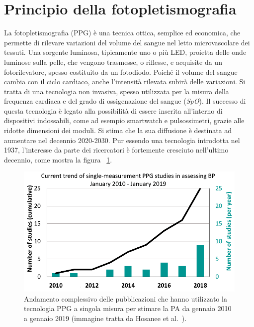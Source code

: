 \section{Principio della fotopletismografia}
La fotopletismografia (PPG) è una tecnica ottica, semplice ed economica, che permette di rilevare variazioni del volume del sangue nel letto microvascolare dei tessuti\cite{Dey2019}. Una sorgente luminosa, tipicamente uno o più LED, proietta delle onde luminose sulla pelle, che vengono trasmesse, o riflesse, e acquisite da un fotorilevatore, spesso costituito da un fotodiodo. Poiché il volume del sangue cambia con il ciclo cardiaco, anche l'intensità rilevata subirà delle variazioni. Si tratta di una tecnologia non invasiva, spesso utilizzata per la misura della frequenza cardiaca e del grado di ossigenazione del sangue (\textit{SpO}). Il successo di questa tecnologia è legato alla possibilità di essere inserita all'interno di dispositivi indossabili, come ad esempio smartwatch e pulsossimetri, grazie alle ridotte dimensioni dei moduli. Si stima che la sua diffusione è destinata ad aumentare nel decennio 2020-2030. Pur essendo una tecnologia introdotta nel 1937, l'interesse da parte dei ricercatori è fortemente cresciuto nell'ultimo decennio, come mostra la figura \Fig~\ref{fig:TrendStudies}.
\begin{figure}[tb]
	\centering
	\includegraphics[width=0.7\linewidth]{ImageFiles/Fotopletismografia/TrendStudies}
	\caption{Andamento complessivo delle pubblicazioni che hanno utilizzato la tecnologia PPG a singola misura per stimare la PA da gennaio 2010 a gennaio 2019 (immagine tratta da Hosanee et al.~\cite{Hosanee2020}).}
	\label{fig:TrendStudies}
\end{figure}
